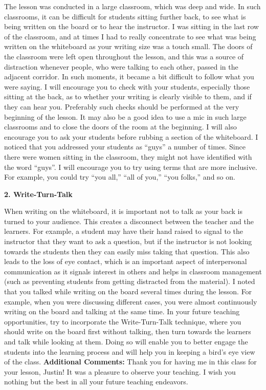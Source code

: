 \documentclass{article}
\begin{document}
The lesson was conducted in a large classroom, which was deep and wide. In such classrooms, it can be difficult for students sitting further back, to see what is being written on the board or to hear the instructor. I was sitting in the last row of the classroom, and at times I had to really concentrate to see what was being written on the whiteboard as your writing size was a touch small. The doors of the classroom were left open throughout the lesson, and this was a source of distraction whenever people, who were talking to each other, passed in the adjacent corridor. In such moments, it became a bit difficult to follow what you were saying. I will encourage you to check with your students, especially those sitting at the back, as to whether your writing is clearly visible to them, and if they can hear you. Preferably such checks should be performed at the very beginning of the lesson. It may also be a good idea to use a mic in such large classrooms and to close the doors of the room at the beginning. I will also encourage you to ask your students before rubbing a section of the whiteboard. I noticed that you addressed your students as “guys” a number of times. Since there were women sitting in the classroom, they
might not have identified with the word “guys”. I will encourage you to try using terms that are more inclusive. For example, you could try “you all,” “all of you,” “you folks,” and so on.

\textbf{2. Write-Turn-Talk}

When writing on the whiteboard, it is important not to talk as your back is turned to your audience. This creates a disconnect between the teacher and the learners. For example, a student may have their hand raised to signal to the instructor that they want to ask a question, but if the instructor is not looking towards the students then they can easily miss taking that question. This also leads to the loss of eye contact, which is an important aspect of interpersonal communication as it signals interest in others and helps in classroom management (such as preventing students from getting distracted from the material). I noted that you talked while writing on the board several times during the lesson. For example, when you were discussing different cases, you were almost continuously writing on the board and talking at the same time. In your future teaching opportunities, try to incorporate the Write-Turn-Talk technique, where you should write on the board first without talking, then turn towards the learners and talk while looking at them. Doing so will enable you to better engage the students into the learning process and will help you in keeping a bird’s eye view of the class.\newline
\textbf{Additional Comments:}
Thank you for having me in this class for your lesson, Justin! It was a pleasure to observe your teaching. I wish you nothing but the best in all your future teaching endeavors.
\end{document}
